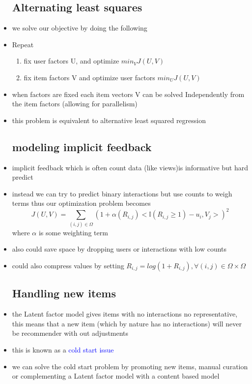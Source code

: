 \documentclass{article}
\begin{document}
\begin{itemize}
\subsection*{Alternating least squares}
\item we solve our objective by  doing the following 
\item Repeat
\begin{enumerate}
    \item fix user factors U, and optimize $min_{V}J(U,V)$
    \item fix item factors V and optimize user factors $min_{U}J(U,V)$
\end{enumerate}
\item when factors are fixed each item vectors V can be solved Independently from the item factors (allowing for parallelism)
\item this problem is equivalent to alternative least squared regression 
\subsection*{modeling implicit feedback }
\item implicit feedback which is often count data (like views)is informative but hard predict 
\item instead we can try to predict binary interactions but use counts to weigh terms thus our optimization problem becomes $$J(U,V)= \sum_{(i,j)\in \Omega}(1+\alpha(R_{i,j})< \mathbb{I}(R_{i,j}\geq 1)-u_{i}, V_{j}>)^{2}$$ where $\alpha$ is some weighting term 
\item also could save space by dropping users or interactions with low counts 
\item could also compress values by setting $R_{i,j}=log(1+R_{i,j}), \forall (i,j)\in \Omega\times\Omega$
\subsection*{Handling new items}
\item the Latent factor model gives items with no interactions no representative, this means that a new item (which by nature has no interactions) will never be recommender with out adjustments
\item this is known as a \textcolor{blue}{cold start issue}
\item we can solve the cold start problem by promoting new items, manual curation or complementing a Latent factor model with a content based model 

\end{itemize}
\end{document}
